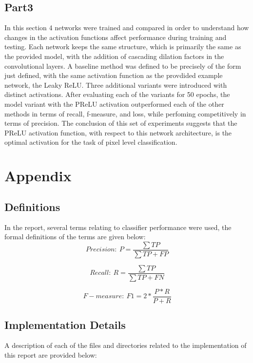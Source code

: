 \documentclass{article}
\begin{document}
\subsection*{Part3}
In this section 4 networks were trained and compared in order to understand how changes in the activation functions affect performance during training and testing. Each network keeps the same structure, which is primarily the same as the provided model, with the addition of cascading dilation factors in the convolutional layers. A baseline method was defined to be precisely of the form just defined, with the same activation function as the provdided example network, the Leaky ReLU. Three additional variants were introduced with distinct activations. After evaluating each of the variants for 50 epochs, the model variant with the PReLU activation outperformed each of the other methods in terms of recall, f-measure, and loss, while perfoming competitively in terms of precision. The conclusion of this set of experiments suggests that the PReLU activation function, with respect to this network  architecture, is the optimal activation for the task of pixel level classification.


\section*{Appendix}
\subsection*{Definitions}
In the report, several terms relating to classifier performance were used, the formal definitions of the terms are given below:
\begin{equation}
Precision: ~ P = \frac{\sum TP}{\sum TP + FP}
\end{equation}

\begin{equation}
Recall: ~ R = \frac{\sum TP}{\sum TP + FN}
\end{equation}

\begin{equation}
F-measure: ~ F1 = 2*\frac{P*R}{P + R}
\end{equation}
\newline

\subsection*{Implementation Details}
A description of each of the files and directories related to the implementation of this report are provided below: 
\end{document}
